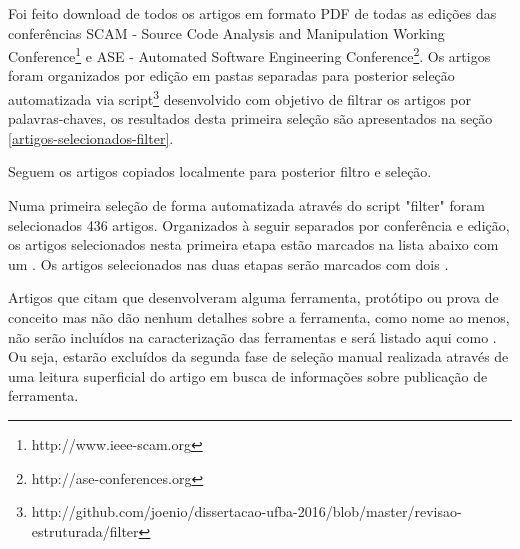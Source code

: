 

Foi feito download de todos os artigos em formato PDF de todas as edições das
conferências SCAM - Source Code Analysis and Manipulation Working
Conference\footnote{http://www.ieee-scam.org} e ASE - Automated Software
Engineering Conference\footnote{http://ase-conferences.org}.
Os artigos foram organizados por edição em pastas separadas para posterior
seleção automatizada via script\footnote{http://github.com/joenio/dissertacao-ufba-2016/blob/master/revisao-estruturada/filter} desenvolvido com objetivo de filtrar os
artigos por palavras-chaves, os resultados desta primeira seleção são apresentados
na seção \ref{artigos-selecionados-filter}.

Seguem os artigos copiados localmente para posterior filtro e seleção.

Numa primeira seleção de forma automatizada através do script "filter" foram
selecionados 436 artigos. Organizados à seguir separados por conferência e
edição, os artigos selecionados nesta primeira etapa estão marcados na lista
abaixo com um {\color{blue} \checkmark}. Os artigos selecionados nas duas
etapas serão marcados com dois {\color{blue} \checkmark \checkmark}.

Artigos que citam que desenvolveram alguma ferramenta, protótipo ou prova de
conceito mas não dão nenhum detalhes sobre a ferramenta, como nome ao menos,
não serão incluídos na caracterização das ferramentas e será listado aqui como
{\color{blue} \checkmark}{\color{red} \texttimes}. Ou seja, estarão excluídos
da segunda fase de seleção manual realizada através de uma leitura superficial
do artigo em busca de informações sobre publicação de ferramenta.

%
%
%
%
%
%
%

